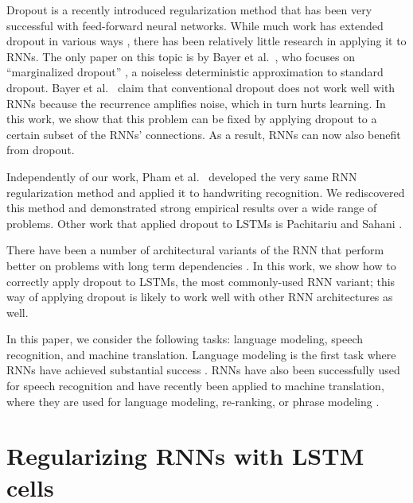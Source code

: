 \documentclass{article} %
\begin{document}
	Dropout \cite{srivastava2013improving} is a recently introduced
	regularization method that has been very successful with
	feed-forward neural networks.   While much work has extended dropout in  
	various ways \cite{wang2013fast,wan2013regularization}, there has
	been relatively little research in applying it to RNNs. The only
	paper on this topic is by Bayer et al.~\cite{bayer2013fast}, who focuses on
	``marginalized dropout'' \cite{wang2013fast}, a
	noiseless deterministic approximation to standard dropout.
	Bayer et al.~\cite{bayer2013fast} claim that conventional dropout does not work well
	with RNNs because the recurrence amplifies noise, which in turn hurts learning. 
	In this work, we show that this problem can be fixed by
	applying dropout to a certain subset of the RNNs' connections.  As a result, RNNs
	can now also benefit from dropout.
	
	
	Independently of our work, Pham et al.~\cite{pham2013dropout}
	developed the very same RNN regularization method and applied it to
	handwriting recognition.  We rediscovered this method and demonstrated
	strong empirical results over a wide range of problems.  Other work
	that applied dropout to LSTMs is Pachitariu and Sahani
	\cite{pachitariu2013regularization}.
	
	There have been a number of architectural variants of the RNN that
	perform better on problems with long term dependencies
	\cite{hochreiter1997long, graves2009novel, cho2014learning,
		jaeger2007optimization, koutnik2014clockwork, sundermeyer2012lstm}.  In this work, we
	show how to correctly apply dropout to LSTMs, the most
	commonly-used RNN variant; this way of applying dropout is likely to
	work well with other RNN architectures as well. 
	
	In this paper, we consider the following tasks: language modeling,
	speech recognition, and machine translation.  Language modeling is the
	first task where RNNs have achieved substantial success
	\cite{mikolov2010recurrent, mikolov2011strategies,
		pascanu2013construct}.  RNNs have also been successfully used for
	speech recognition \cite{robinson1996use, graves2013speech} and have
	recently been applied to machine translation, where they are 
	used for language modeling, re-ranking, or phrase modeling
	\cite{devlin14,kal13,cho2014learning,chow1987byblos,mikolov2013exploiting}.
	
	
	\section{Regularizing RNNs with LSTM cells}
	
\end{document}
